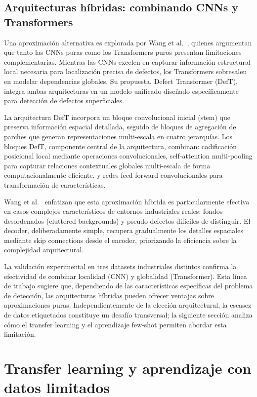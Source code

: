 \subsection{Arquitecturas híbridas: combinando CNNs y Transformers}

Una aproximación alternativa es explorada por Wang et al.~\cite{wang2022defect}, quienes argumentan que tanto las CNNs puras como los Transformers puros presentan limitaciones complementarias. Mientras las CNNs excelen en capturar información estructural local necesaria para localización precisa de defectos, los Transformers sobresalen en modelar dependencias globales. Su propuesta, Defect Transformer (DefT), integra ambas arquitecturas en un modelo unificado diseñado específicamente para detección de defectos superficiales.

La arquitectura DefT incorpora un bloque convolucional inicial (stem) que preserva información espacial detallada, seguido de bloques de agregación de parches que generan representaciones multi-escala en cuatro jerarquías. Los bloques DefT, componente central de la arquitectura, combinan: codificación posicional local mediante operaciones convolucionales, self-attention multi-pooling para capturar relaciones contextuales globales multi-escala de forma computacionalmente eficiente, y redes feed-forward convolucionales para transformación de características.

Wang et al.~\cite{wang2022defect} enfatizan que esta aproximación híbrida es particularmente efectiva en casos complejos característicos de entornos industriales reales: fondos desordenados (cluttered backgrounds) y pseudo-defectos difíciles de distinguir. El decoder, deliberadamente simple, recupera gradualmente los detalles espaciales mediante skip connections desde el encoder, priorizando la eficiencia sobre la complejidad arquitectural.

La validación experimental en tres datasets industriales distintos confirma la efectividad de combinar localidad (CNN) y globalidad (Transformer). Esta línea de trabajo sugiere que, dependiendo de las características específicas del problema de detección, las arquitecturas híbridas pueden ofrecer ventajas sobre aproximaciones puras. Independientemente de la elección arquitectural, la escasez de datos etiquetados constituye un desafío transversal; la siguiente sección analiza cómo el transfer learning y el aprendizaje few-shot permiten abordar esta limitación.

\section{Transfer learning y aprendizaje con datos limitados}

